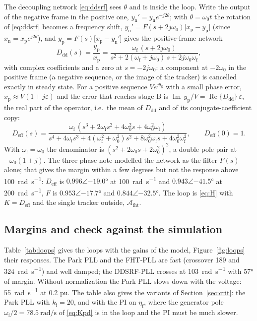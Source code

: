 \documentclass[11pt,a4paper]{scrartcl}
\newcommand{\ped}[1]{_{\mathrm{#1}}}
\begin{document}
\begin{onehalfspace}
The decoupling network \eqref{eq:ddsrf} sees $\theta$ and is inside the loop. Write the output of the negative frame in the positive one, $y\ped{n}' = y\ped{n}e^{-j2\theta}$; with $\theta = \omega_0 t$ the rotation of \eqref{eq:ddsrf} becomes a frequency shift, $y\ped{n}' = F(s + 2j\omega_0)\big[x\ped{p} - y\ped{p}\big]$ (since $x\ped{n} = x\ped{p}e^{j2\theta}$), and $y\ped{p} = F(s)\big[x\ped{p} - y\ped{n}'\big]$ gives the positive-frame network
\begin{equation}
	D\ped{dd}(s) = \frac{y\ped{p}}{x\ped{p}} = \frac{\omega\ped{f}\,(s + 2j\omega_0)}{s^2 + 2(\omega\ped{f} + j\omega_0)\,s + 2j\omega_0\omega\ped{f}},
	\label{eq:Ddd}
\end{equation}
with complex coefficients and a zero at $s = -2j\omega_0$: a component at $-2\omega_0$ in the positive frame (a negative sequence, or the image of the tracker) is cancelled exactly in steady state. For a positive sequence $V e^{j\theta\ped{g}}$ with a small phase error, $x\ped{p} \approx V(1 + j\varepsilon)$ and the error that reaches stage B is $\operatorname{Im}\,y\ped{p}/V = \operatorname{Re}\{D\ped{dd}\}\,\varepsilon$, the real part of the operator, i.e.\ the mean of $D\ped{dd}$ and of its conjugate-coefficient copy:
\begin{equation}
	D\ped{eff}(s) = \frac{\omega\ped{f}\,(s^3 + 2\omega\ped{f}s^2 + 4\omega_0^2 s + 4\omega_0^2\omega\ped{f})}{s^4 + 4\omega\ped{f}s^3 + 4(\omega\ped{f}^2 + \omega_0^2)s^2 + 8\omega_0^2\omega\ped{f}s + 4\omega_0^2\omega\ped{f}^2},
	\qquad D\ped{eff}(0) = 1 .
	\label{eq:Deff}
\end{equation}
With $\omega\ped{f} = \omega_0$ the denominator is $(s^2 + 2\omega_0 s + 2\omega_0^2)^2$, a double pole pair at $-\omega_0(1 \pm j)$. The three-phase note \cite{note_3ph} modelled the network as the filter $F(s)$ alone; that gives the margin within a few degrees but not the response above \SI{100}{\radian\per\second}: $D\ped{eff}$ is $0.996\angle\ang{-19.0}$ at \SI{100}{\radian\per\second} and $0.943\angle\ang{-41.5}$ at \SI{200}{\radian\per\second}, $F$ is $0.953\angle\ang{-17.7}$ and $0.844\angle\ang{-32.5}$. The loop is \eqref{eq:H} with $K = D\ped{eff}$ and the single tracker outside, $\mathcal{A}\ped{fht}$.

\subsection{Margins and check against the simulation}
\label{sec:check}

Table~\ref{tab:loops} gives the loops with the gains of the model, Figure~\ref{fig:loops} their responses. The Park PLL and the FHT-PLL are fast (crossover \SI{189}{} and \SI{324}{\radian\per\second}) and well damped; the DDSRF-PLL crosses at \SI{103}{\radian\per\second} with \ang{57} of margin. Without normalization the Park PLL slows down with the voltage: \SI{55}{\radian\per\second} at \num{0.2} pu. The table also gives the variants of Section~\ref{sec:crit}: the Park PLL with $k\ped{i} = 20$, and with the PI on $\eta\ped{f}$, where the generator pole $\omega\ped{f}/2 = \SI{78.5}{\radian\per\second}$ of \eqref{eq:Kpd} is in the loop and the PI must be much slower.


\end{onehalfspace}
\end{document}
